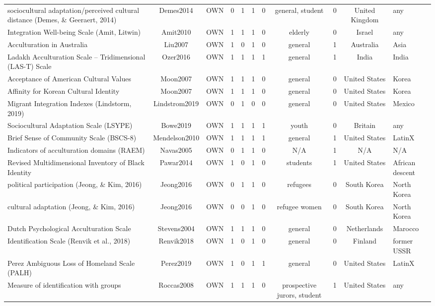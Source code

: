 \begin{longtable}[l]{lclclclclcl}
sociocultural adaptation/perceived cultural distance (Demes, \& Geeraert, 2014) & Demes2014 & OWN & 0 & 1 & 1 & 0 & general, student & 0 & United Kingdom & any\\
Integration Well-being Scale (Amit, Litwin) & Amit2010 & OWN & 1 & 1 & 1 & 0 & elderly & 0 & Israel & any\\
Acculturation in Australia & Liu2007 & OWN & 1 & 0 & 1 & 0 & general & 1 & Australia & Asia\\
Ladakh Acculturation Scale – Tridimensional (LAS-T) Scale & Ozer2016 & OWN & 1 & 1 & 1 & 1 & general & 1 & India & India\\
Acceptance of American Cultural Values & Moon2007 & OWN & 1 & 1 & 1 & 0 & general & 0 & United States & Korea\\
Affinity for Korean Cultural Identity & Moon2007 & OWN & 1 & 1 & 1 & 0 & general & 0 & United States & Korea\\
Migrant Integration Indexes (Lindstorm, 2019) & Lindstrom2019 & OWN & 0 & 1 & 0 & 0 & general & 0 & United States & Mexico\\
Sociocultural Adaptation Scale (LSYPE) & Bowe2019 & OWN & 1 & 1 & 1 & 1 & youth & 0 & Britain & any\\
Brief Sense of Community Scale (BSCS-8) & Mendelson2010 & OWN & 1 & 1 & 1 & 1 & general & 1 & United States & LatinX\\
Indicators of acculturation domains (RAEM) & Navas2005 & OWN & 0 & 1 & 1 & 0 & N/A & 1 & N/A & N/A\\
Revised Multidimensional Inventory of Black Identity & Pawar2014 & OWN & 1 & 0 & 1 & 0 & students & 1 & United States & African descent\\
political participation (Jeong, \& Kim, 2016) & Jeong2016 & OWN & 0 & 1 & 1 & 0 & refugees & 0 & South Korea & North Korea\\
cultural adaptation (Jeong, \& Kim, 2016) & Jeong2016 & OWN & 0 & 0 & 1 & 0 & refugee women & 0 & South Korea & North Korea\\
Dutch Psychological Acculturation Scale & Stevens2004 & OWN & 1 & 1 & 1 & 0 & general & 0 & Netherlands & Marocco\\
Identification Scale (Renvik et al., 2018) & Renvik2018 & OWN & 1 & 0 & 1 & 0 & general & 0 & Finland & former USSR\\
Perez Ambiguous Loss of Homeland Scale (PALH) & Perez2019 & OWN & 1 & 0 & 1 & 1 & general & 0 & United States & LatinX\\
Measure of identification with groups & Roccas2008 & OWN & 1 & 1 & 1 & 0 & prospective jurors, student & 1 & United States & any\\

\end{longtable}
